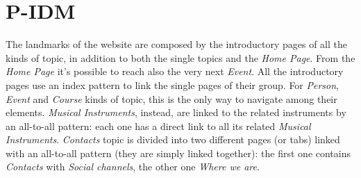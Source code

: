 \documentclass[../../DD.tex]{subfiles}
\begin{document}
\section{P-IDM}
	The landmarks of the website are composed by the introductory pages of all the kinds of topic, in addition to both the single topics and the \textit{Home Page}. From the \textit{Home Page} it's possible to reach also the very next \textit{Event}.
	\newline
	All the introductory pages use an index pattern to link the single pages of their group. For \textit{Person}, \textit{Event} and \textit{Course} kinds of topic, this is the only way to navigate among their elements. \textit{Musical Instruments}, instead, are linked to the related instruments by an all-to-all pattern: each one has a direct link to all its related \textit{Musical Instruments}.
	\newline
	\textit{Contacts} topic is divided into two different pages (or tabs) linked with an all-to-all pattern (they are simply linked together): the first one contains \textit{Contacts} with \textit{Social channels}, the other one \textit{Where we are}.
\end{document}
